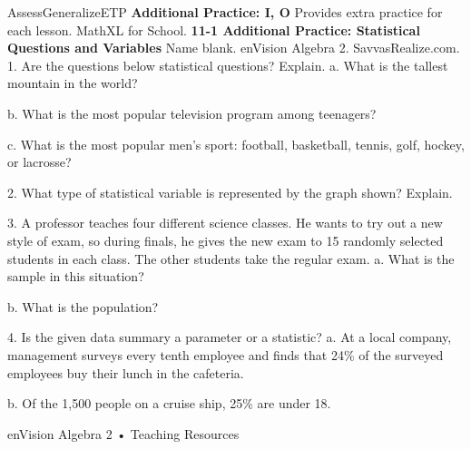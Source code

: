 \documentclass{article}
\newenvironment{te-addendum}[2]{}{}     %
\newcommand{\answer}[1]{}               %
\newcommand{\placeholder}[2]{}          %
\newcommand{\te}[1]{}                   %
\begin{document}
\begin{te-addendum}{Assess}{GeneralizeETP}
\textbf{Additional Practice: I, O}
Provides extra practice for each lesson. MathXL for School.
\textbf{11-1 Additional Practice: Statistical Questions and Variables}
Name blank. enVision Algebra 2. SavvasRealize.com.
1. Are the questions below statistical questions? Explain.
a. What is the tallest mountain in the world?
\answer{No; it can be answered using one piece of information.}
b. What is the most popular television program among teenagers?
\answer{Yes; multiple responses are anticipated.}
c. What is the most popular men's sport: football, basketball, tennis, golf, hockey, or lacrosse?
\answer{Yes; it is a categorical statistical question with a variety of choices for the response.}
2. What type of statistical variable is represented by the graph shown? Explain.
\placeholder{graph}{Grayscale pie chart with legend Fish, Apples, Avocados, Chicken, Carrots, Broccoli. Clockwise sectors from top are 15\%,20\%,15\%,25\%,10\%,15\%, in progressively varied gray fills. No title or axes.}
\answer{Categorical; the data indicate qualitative attributes.}
3. A professor teaches four different science classes. He wants to try out a new style of exam, so during finals, he gives the new exam to 15 randomly selected students in each class. The other students take the regular exam.
a. What is the sample in this situation?
\answer{the 15 students who received the new exam}
b. What is the population?
\answer{all the students in the professor's classes}
\te{Printed 15 students in the answer; likely 60 in total because the prompt specifies 15 in each of four classes.}
4. Is the given data summary a parameter or a statistic?
a. At a local company, management surveys every tenth employee and finds that 24\% of the surveyed employees buy their lunch in the cafeteria.
\answer{statistic}
b. Of the 1,500 people on a cruise ship, 25\% are under 18.
\answer{parameter}
enVision Algebra 2 • Teaching Resources
\end{te-addendum}
\end{document}
